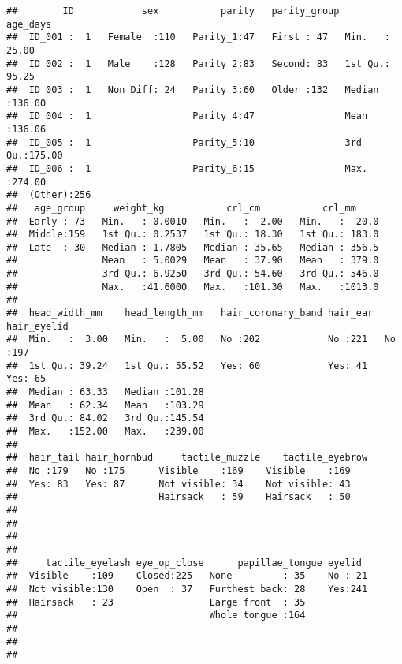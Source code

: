 \documentclass[
]{article}
\newenvironment{Shaded}{\begin{snugshade}}{\end{snugshade}}
\newcommand{\KeywordTok}[1]{\textcolor[rgb]{0.13,0.29,0.53}{\textbf{#1}}}
\newcommand{\NormalTok}[1]{#1}
\newcommand{\OperatorTok}[1]{\textcolor[rgb]{0.81,0.36,0.00}{\textbf{#1}}}
\newcommand{\StringTok}[1]{\textcolor[rgb]{0.31,0.60,0.02}{#1}}
\begin{document}
\begin{Shaded}
\end{Shaded}

\begin{verbatim}
##        ID            sex           parity   parity_group    age_days     
##  ID_001 :  1   Female  :110   Parity_1:47   First : 47   Min.   : 25.00  
##  ID_002 :  1   Male    :128   Parity_2:83   Second: 83   1st Qu.: 95.25  
##  ID_003 :  1   Non Diff: 24   Parity_3:60   Older :132   Median :136.00  
##  ID_004 :  1                  Parity_4:47                Mean   :136.06  
##  ID_005 :  1                  Parity_5:10                3rd Qu.:175.00  
##  ID_006 :  1                  Parity_6:15                Max.   :274.00  
##  (Other):256                                                             
##   age_group     weight_kg           crl_cm           crl_mm      
##  Early : 73   Min.   : 0.0010   Min.   :  2.00   Min.   :  20.0  
##  Middle:159   1st Qu.: 0.2537   1st Qu.: 18.30   1st Qu.: 183.0  
##  Late  : 30   Median : 1.7805   Median : 35.65   Median : 356.5  
##               Mean   : 5.0029   Mean   : 37.90   Mean   : 379.0  
##               3rd Qu.: 6.9250   3rd Qu.: 54.60   3rd Qu.: 546.0  
##               Max.   :41.6000   Max.   :101.30   Max.   :1013.0  
##                                                                  
##  head_width_mm    head_length_mm   hair_coronary_band hair_ear  hair_eyelid
##  Min.   :  3.00   Min.   :  5.00   No :202            No :221   No :197    
##  1st Qu.: 39.24   1st Qu.: 55.52   Yes: 60            Yes: 41   Yes: 65    
##  Median : 63.33   Median :101.28                                           
##  Mean   : 62.34   Mean   :103.29                                           
##  3rd Qu.: 84.02   3rd Qu.:145.54                                           
##  Max.   :152.00   Max.   :239.00                                           
##                                                                            
##  hair_tail hair_hornbud     tactile_muzzle    tactile_eyebrow
##  No :179   No :175      Visible    :169    Visible    :169   
##  Yes: 83   Yes: 87      Not visible: 34    Not visible: 43   
##                         Hairsack   : 59    Hairsack   : 50   
##                                                              
##                                                              
##                                                              
##                                                              
##     tactile_eyelash eye_op_close      papillae_tongue eyelid   
##  Visible    :109    Closed:225   None         : 35    No : 21  
##  Not visible:130    Open  : 37   Furthest back: 28    Yes:241  
##  Hairsack   : 23                 Large front  : 35             
##                                  Whole tongue :164             
##                                                                
##                                                                
## 
\end{verbatim}
\end{document}

